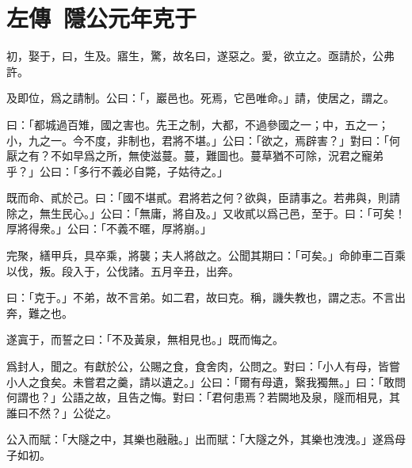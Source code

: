 \section[鄭伯克段于鄢\quad{\small 左傳\ 隱公元年}]{{\normalsize 左傳\ 隱公元年}\quad {}克于}
初，娶于，曰，生及。寤生，驚，故名曰，遂惡之。愛，欲立之。亟請於，公弗許。

及即位，爲之請制。公曰：「，巖邑也。死焉，它邑唯命。」請，使居之，謂之。

曰：「都城過百雉，國之害也。先王之制，大都，不過參國之一；中，五之一；小，九之一。今不度，非制也，君將不堪。」公曰：「欲之，焉辟害？」對曰：「何厭之有？不如早爲之所，無使滋蔓。蔓，難圖也。蔓草猶不可除，況君之寵弟乎？」公曰：「多行不義必自斃，子姑待之。」

既而命、貳於己。曰：「國不堪貳。君將若之何？欲與，臣請事之。若弗與，則請除之，無生民心。」公曰：「無庸，將自及。」又收貳以爲己邑，至于。曰：「可矣！厚將得衆。」公曰：「不義不暱，厚將崩。」

完聚，繕甲兵，具卒乘，將襲；夫人將啟之。公聞其期曰：「可矣。」命帥車二百乘以伐，叛。段入于，公伐諸。五月辛丑，出奔。

曰：「克于。」不弟，故不言弟。如二君，故曰克。稱，譏失教也，謂之志。不言出奔，難之也。

遂寘于，而誓之曰：「不及黃泉，無相見也。」既而悔之。

爲封人，聞之。有獻於公，公賜之食，食舍肉，公問之。對曰：「小人有母，皆嘗小人之食矣。未嘗君之羹，請以遺之。」公曰：「爾有母遺，繄我獨無。」曰：「敢問何謂也？」公語之故，且告之悔。對曰：「君何患焉？若闕地及泉，隧而相見，其誰曰不然？」公從之。

公入而賦：「大隧之中，其樂也融融。」出而賦：「大隧之外，其樂也洩洩。」遂爲母子如初。

